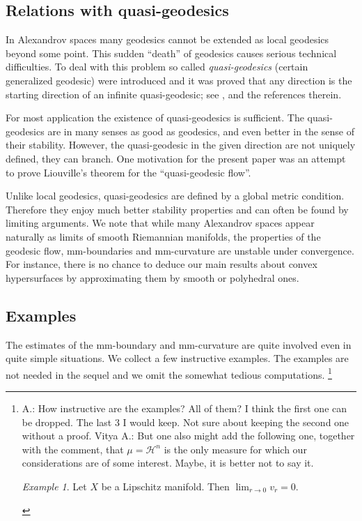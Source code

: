 \documentclass[12pt,leqno]{amsart}
\numberwithin{equation}{section}
\theoremstyle{definition}
\theoremstyle{remark}
\newtheorem{ex}[thm]{Example}
\begin{document}
\subsection{Relations with quasi-geodesics}
In Alexandrov spaces  many geodesics cannot be extended as local geodesics beyond some point.
This sudden ``death''  of geodesics  causes  serious technical difficulties.
To deal with this problem  so called \emph{quasi-geodesics} (certain generalized geodesic)
were introduced
and it was proved
that any direction is the starting direction of an infinite quasi-geodesic;
see \cite{Petsemi}, \cite{PP} and the references therein.

For most application the existence of quasi-geodesics is sufficient.
The quasi-geodesics are in many senses as good as geodesics, and even better in the sense of their stability.
However, the quasi-geodesic in the given direction are not uniquely defined, they can branch.
One motivation for the present paper was an attempt to prove Liouville's theorem for the ``quasi-geodesic flow''.

Unlike local geodesics, quasi-geodesics are defined by a global metric condition. Therefore they enjoy much better stability properties
and can often be found by limiting arguments.
We note that while many Alexandrov spaces appear naturally  as limits of smooth Riemannian manifolds, the properties of the geodesic flow, mm-boundaries and mm-curvature are unstable under
convergence.
For instance, there is  no chance to deduce our main results about convex hypersurfaces by approximating them by smooth or polyhedral ones.



\subsection{Examples} \label{subsec:example}
The estimates of the   mm-boundary and mm-curvature are quite involved even in  quite  simple situations.
We collect a few instructive examples. %
The examples  are not  needed in the sequel and we omit the somewhat tedious computations. \footnote{A.: How instructive are the examples? All of them?{\color{red} I think the  first one can be dropped. The last 3 I would keep. Not sure about keeping the second one without a proof. Vitya}
 A.:   But one also might add the following one, together with the comment, that $\mu =\mathcal H^n$ is the only measure for which our considerations are of some interest.  Maybe, it is better not to say it.  \begin{ex}
Let $X$ be a Lipschitz manifold.
Then $\lim _{r\to 0} v_r =0$.
\end{ex}
}
\end{document}
